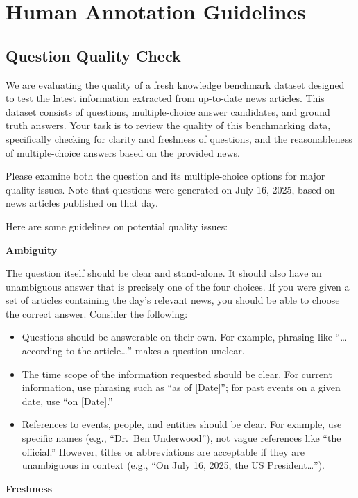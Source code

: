 \documentclass[11pt]{article}
\begin{document}
\clearpage
\section{Human Annotation Guidelines}
\label{sec:human-annotation-guidelines}
\subsection{Question Quality Check}

We are evaluating the quality of a fresh knowledge benchmark dataset designed to test the latest information extracted from up-to-date news articles. This dataset consists of questions, multiple-choice answer candidates, and ground truth answers. Your task is to review the quality of this benchmarking data, specifically checking for clarity and freshness of questions, and the reasonableness of multiple-choice answers based on the provided news.

Please examine both the question and its multiple-choice options for major quality issues. Note that questions were generated on July 16, 2025, based on news articles published on that day.

Here are some guidelines on potential quality issues:

\textbf{Ambiguity}

The question itself should be clear and stand-alone. It should also have an unambiguous answer that is precisely one of the four choices. If you were given a set of articles containing the day's relevant news, you should be able to choose the correct answer. Consider the following:
\begin{itemize}
    \item Questions should be answerable on their own. For example, phrasing like ``\ldots according to the article\ldots'' makes a question unclear.
    \item The time scope of the information requested should be clear. For current information, use phrasing such as ``as of [Date]''; for past events on a given date, use ``on [Date].''
    \item References to events, people, and entities should be clear. For example, use specific names (e.g., ``Dr.\ Ben Underwood''), not vague references like ``the official.'' However, titles or abbreviations are acceptable if they are unambiguous in context (e.g., ``On July 16, 2025, the US President\ldots'').
\end{itemize}

\textbf{Freshness}
\end{document}
